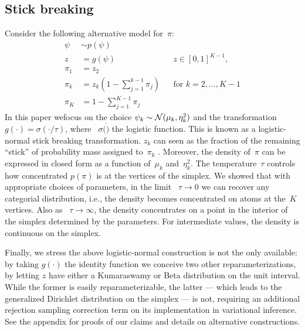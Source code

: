 \documentclass{article}
\begin{document}
\subsection{Stick breaking}
Consider the following alternative model for~${\pi}$:
\begin{align}
  \psi &\sim p(\psi) \\
  z &  = g(\psi) & & z\in[0,1]^{K-1}, \\ 
   {\pi}_1 &= z_2 \\
  {\pi}_k &= z_k (1- \sum_{j=1}^{k-1} {\pi}_j) & &  \text{for } k=2, \ldots, K-1\\
{\pi}_K &= 1- \sum_{j=1}^{K-1} {\pi}_j
\end{align}
In this paper wefocus on the choice $\psi_k \sim \mathcal{N}(\mu_k, \eta_k^2) $ and the transformation $g(\cdot) = \sigma(\cdot/ \tau)$, where ~$\sigma(\dot)$ the logistic function. This is known as a logistic-normal stick breaking transformation. $z_k$ can seen as the fraction of the remaining ``stick'' of probability mass assigned to~${\pi}_k$ \citep{linderman2015dependent}. Moreover,
the density of~${\pi}$ can be expressed in closed form as a
function of~$\mu_k$ and~$\eta_k^2$.  The temperature~$\tau$ controls how
concentrated $p(\pi)$ is at the vertices of the simplex. We showed that with appropriate choices of parameters, in the limit ~$\tau \to 0$ we can recover any categorial distribution, i.e., the density becomes concentrated on atoms at the~$K$ vertices. Also as ~$\tau \to \infty$, the density concentrates on a point in the interior of the simplex
determined by the parameters. For intermediate values, the density is
continuous on the simplex. 

Finally, we stress the above logistic-normal construction is not the only available: by taking $g(\cdot) $ the identity function we conceive two other reparameterizations, by letting $z$ have either a Kumaraswamy or Beta distribution on the unit interval. While the former is easily reparameterizable, the latter --- which leads to the generalized Dirichlet distribution on the simplex ---  is not, requiring an additional rejection sampling correction term on its implementation in variational inference.
See the appendix for proofs of our claims and details on alternative constructions.
\end{document}
